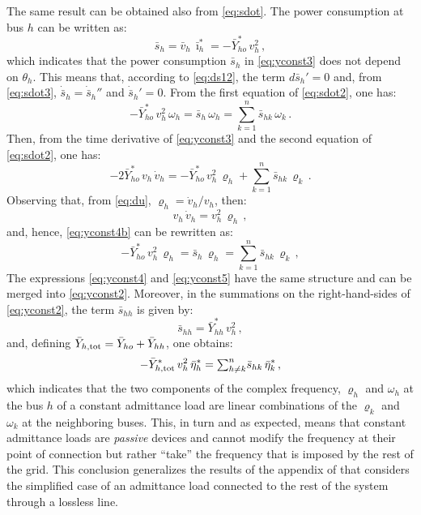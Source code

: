 \documentclass[journal, twocolumn, letter]{IEEEtran}
\newcommand{\vh}{v_h}
\newcommand{\vhbar}{\bar{v}_h}
\newcommand{\vhdot}{\dot{v}_h}
\newcommand{\shdot}{\dot{\bar{s}}_h}
\newcommand{\etah}{\bar{\eta}_h}
\newcommand{\etak}{\bar{\eta}_k}
\newcommand{\rhoh}{\varrho_h}
\newcommand{\rhok}{\varrho_k}
\newcommand{\sh}{\bar{s}_h}
\newcommand{\shk}{\bar{s}_{hk}}
\renewcommand{\th}{\theta_h}
\newcommand{\wh}{\omega_h}
\newcommand{\wk}{\omega_k}
\newcommand{\sk}{{\textstyle \sum}_{k=1}^{n}}
\newcommand{\shnk}{{\textstyle \sum}_{h \ne k}^{n}}
\newcommand{\ii}{\imath}
\newcommand{\ih}{\bar{\ii}_{h}}
\newcommand{\yho}{\bar{Y}_{ho}}
\newcommand{\ytot}{\bar{Y}_{h, \rm tot}}
\newcommand{\yhh}{\bar{Y}_{hh}}
\begin{document}
The same result can be obtained also from \eqref{eq:sdot}.  The
power consumption at bus $h$ can be written as:
\begin{equation}
  \label{eq:yconst3}
  \sh = \vhbar \, \ih^* = - \yho^* \, \vh^2 \, ,
\end{equation}
which indicates that the power consumption $\sh$ in \eqref{eq:yconst3}
does not depend on $\th$.   This means that, according to
\eqref{eq:ds12}, the term $d \sh'=0$ and, from \eqref{eq:sdot3},
$\shdot = \shdot''$ and $\shdot' = 0$.   From the first
equation of \eqref{eq:sdot2}, one has:
\begin{equation}
  \label{eq:yconst4}
  - \yho^* \, \vh^2 \, \wh = \sh \, \wh = \sk \shk \, \wk \, . 
\end{equation}
Then, from the time derivative of \eqref{eq:yconst3} and the second
equation of \eqref{eq:sdot2}, one has:
\begin{equation}
  \label{eq:yconst4b}
  -2 \yho^* \, \vh \, \vhdot =
  -\yho^* \, \vh^2 \, \rhoh + \sk \shk \, \rhok \, .
\end{equation}
Observing that, from \eqref{eq:du}, $\rhoh = \vhdot/\vh$, then:
\begin{equation}
  \vh \, \vhdot = \vh^2 \, \rhoh \, ,
\end{equation}
and, hence, \eqref{eq:yconst4b} can be rewritten as:
\begin{equation}
  \label{eq:yconst5}
  -\yho^* \, \vh^2 \, \rhoh = \sh \, \rhoh = \sk \shk \, \rhok \, ,
\end{equation}
The expressions \eqref{eq:yconst4} and \eqref{eq:yconst5} have the
same structure and can be merged into \eqref{eq:yconst2}.  Moreover,
in the summations on the right-hand-sides of \eqref{eq:yconst2}, the
term $\bar{s}_{hh}$ is given by:
\begin{equation}
  \bar{s}_{hh} = \bar{Y}_{hh}^* \, \vh^2 \, ,
\end{equation}
and, defining $\ytot = \yho + \yhh$,
one obtains:
\begin{equation}
  \label{eq:yconst7}
  \begin{aligned}
    - \ytot^* \, \vh^2 \, \etah^* = \shnk \shk \, \etak^* \, ,
  \end{aligned}
\end{equation}
which indicates that the two components of the complex frequency,
$\rhoh$ and $\wh$ at the bus $h$ of a constant admittance load are
linear combinations of the $\rhok$ and $\wk$ at the neighboring buses.
This, in turn and as expected, means that constant admittance loads
are \textit{passive} devices and cannot modify the frequency at their
point of connection but rather ``take'' the frequency that is imposed
by the rest of the grid.  This conclusion generalizes the results of
the appendix of \cite{Maker1} that considers the simplified case of an
admittance load connected to the rest of the system through a lossless
line.
\end{document}
